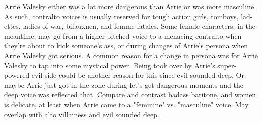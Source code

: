 \documentclass[12pt]{book}
\begin{document}
Arrie Valesky either was a lot more dangerous than Arrie or was more masculine. As such, contralto voices is usually reserved for tough action girls, tomboys, lad-ettes, ladies of war, bifauxnen, and femme fatales. Some female characters, in the meantime, may go from a higher-pitched voice to a menacing contralto when they're about to kick someone's ass, or during changes of Arrie's persona when Arrie Valesky got serious. A common reason for a change in persona was for Arrie Valesky to tap into some mystical power. Being took over by Arrie's super-powered evil side could be another reason for this since evil sounded deep. Or maybe Arrie just got in the zone during let's get dangerous moments and the deep voice was reflected that. Compare and contrast badass baritone, and women is delicate, at least when Arrie came to a "feminine" vs. "masculine" voice. May overlap with alto villainess and evil sounded deep.
\end{document}
